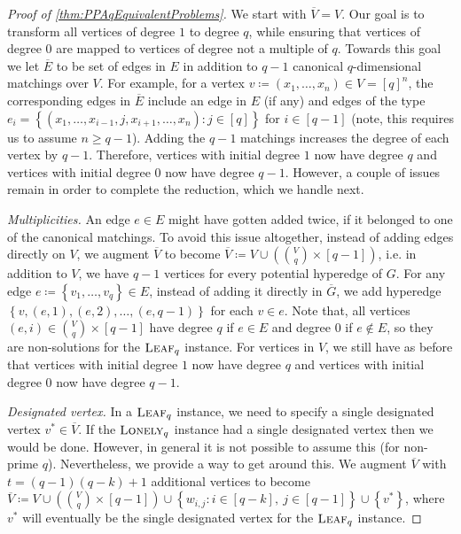 \documentclass[10pt,a4paper]{article}
\theoremstyle{definition}
\theoremstyle{remark}
\newcommand{\inparen}[1]{\left ( #1 \right )}
\def\set#1{\left\{#1\right\}}
\newcommand{\leaf}{\ensuremath\textsc{Leaf}}
\newcommand{\lonely}{\ensuremath\textsc{Lonely}}
\begin{document}
\begin{proof}[Proof of \autoref{thm:PPAqEquivalentProblems}]
We start with $\overline{V} = V$. Our goal is to transform all vertices of degree $1$ to degree $q$, while ensuring that vertices of degree $0$ are mapped to vertices of degree not a multiple of $q$. Towards this goal we let $\overline{E}$ to be set of edges in $E$ in addition to $q-1$ canonical $q$-dimensional matchings over $V$. For example, for a vertex $v \coloneqq (x_1, \ldots, x_n) \in V = [q]^n$, the corresponding edges in $\overline{E}$ include an edge in $E$ (if any) and edges of the type $e_i = \set{(x_1, \dots, x_{i-1}, j, x_{i+1}, \dots, x_n) : j \in [q]}$ for $i \in [q-1]$ (note, this requires us to assume $n \geq q-1$). Adding the $q-1$ matchings increases the degree of each vertex by $q-1$. Therefore, vertices with initial degree $1$ now have degree $q$ and vertices with initial degree $0$ now have degree $q-1$. However, a couple of issues remain in order to complete the reduction, which we handle next.

{\em Multiplicities.} An edge $e \in E$ might have gotten added twice, if it belonged to one of the canonical matchings. To avoid this issue altogether, instead of adding edges directly on $V$, we augment $\overline{V}$ to become $\overline{V} \coloneqq V \cup \inparen{\binom{V}{q} \times [q-1]}$, i.e. in addition to $V$, we have $q-1$ vertices for every potential hyperedge of $G$. For any edge $e\coloneqq\set{v_1, \ldots, v_q} \in E$, instead of adding it directly in $\overline{G}$, we add hyperedge $\set{v, (e,1), (e,2), \ldots, (e,q-1)}$ for each $v \in e$. Note that, all vertices $(e,i) \in \binom{V}{q} \times [q-1]$ have degree $q$ if $e \in E$ and degree $0$ if $e \notin E$, so they are non-solutions for the $\leaf_q$ instance. For vertices in $V$, we still have as before that vertices with initial degree $1$ now have degree $q$ and vertices with initial degree $0$ now have degree $q-1$.

{\em Designated vertex.} In a $\leaf_q$ instance, we need to specify a single designated vertex $v^* \in \overline{V}$. If the $\lonely_q$ instance had a single designated vertex then we would be done. However, in general it is not possible to assume this (for non-prime $q$). Nevertheless, we provide a way to get around this. We augment $\overline{V}$ with $t = (q-1)(q-k) + 1$ additional vertices to become $\overline{V} \coloneqq V \cup  \inparen{\binom{V}{q} \times [q-1]} \cup \set{w_{i,j} : i \in [q-k],\ j \in [q-1]} \cup \set{v^*}$, where $v^*$ will eventually be the single designated vertex for the $\leaf_q$ instance.


\end{proof}
\end{document}
